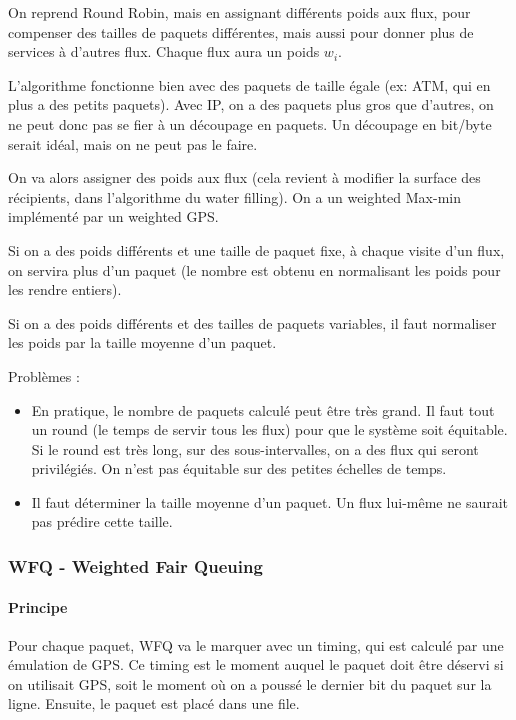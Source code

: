 \documentclass[10pt,a4paper]{report}
\begin{document}
			On reprend Round Robin, mais en assignant différents poids aux flux, pour compenser des tailles de paquets différentes, mais aussi pour donner plus de services à d'autres flux. Chaque flux aura un poids $w_i$.
			
			L'algorithme fonctionne bien avec des paquets de taille égale (ex: ATM, qui en plus a des petits paquets). Avec IP, on a des paquets plus gros que d'autres, on ne peut donc pas se fier à un découpage en paquets. Un découpage en bit/byte serait idéal, mais on ne peut pas le faire.
			
			On va alors assigner des poids aux flux (cela revient à modifier la surface des récipients, dans l'algorithme du water filling). On a un weighted Max-min implémenté par un weighted GPS.
			
			
			Si on a des poids différents et une taille de paquet fixe, à chaque visite d'un flux, on servira plus d'un paquet (le nombre est obtenu en normalisant les poids pour les rendre entiers).
			
			Si on a des poids différents et des tailles de paquets variables, il faut normaliser les poids par la taille moyenne d'un paquet.
			
			
			Problèmes :
			
			\begin{itemize}
				\item En pratique, le nombre de paquets calculé peut être très grand. Il faut tout un round (le temps de servir tous les flux) pour que le système soit équitable. Si le round est très long, sur des sous-intervalles, on a des flux qui seront privilégiés. On n'est pas équitable sur des petites échelles de temps.
				\item Il faut déterminer la taille moyenne d'un paquet. Un flux lui-même ne saurait pas prédire cette taille.
			\end{itemize}
						
			\subsubsection{WFQ - Weighted Fair Queuing}
			
			\paragraph{Principe}
			Pour chaque paquet, WFQ va le marquer avec un timing, qui est calculé par une émulation de GPS. Ce timing est le moment auquel le paquet doit être déservi si on utilisait GPS, soit le moment où on a poussé le dernier bit du paquet sur la ligne. Ensuite, le paquet est placé dans une file.
			
\end{document}
